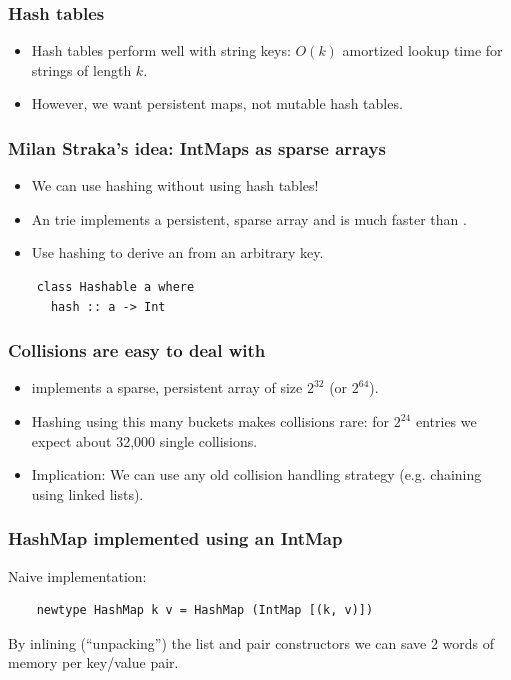 \documentclass[xetex,mathserif,serif]{beamer}
\newcommand{\code}[1]{\mbox{\texttt{\small{\color{CodeColor}{#1}}}}}
\begin{document}
\begin{frame}
  \frametitle{Hash tables}
  \begin{itemize}
  \item Hash tables perform well with string keys: $O(k)$ amortized
    lookup time for strings of length $k$.
  \item However, we want persistent maps, not mutable hash tables.
  \end{itemize}
\end{frame}

\begin{frame}[fragile]
  \frametitle{Milan Straka's idea: IntMaps as sparse arrays}
  \begin{itemize}
  \item We can use hashing without using hash tables!
  \item An \code{Data.IntMap} trie implements a persistent, sparse
    array and is much faster than \code{Data.Map}.
  \item Use hashing to derive an \code{Int} from an arbitrary
    key.
  \end{itemize}
  \begin{lstlisting}
    class Hashable a where
      hash :: a -> Int
  \end{lstlisting}
\end{frame}

\begin{frame}
  \frametitle{Collisions are easy to deal with}
  \begin{itemize}
  \item \code{IntMap} implements a sparse, persistent array of size
    $2^{32}$ (or $2^{64}$).
  \item Hashing using this many buckets makes collisions rare: for
    $2^{24}$ entries we expect about 32,000 single collisions.
  \item Implication: We can use any old collision handling strategy
    (e.g. chaining using linked lists).
  \end{itemize}
\end{frame}

\begin{frame}[fragile]
  \frametitle{HashMap implemented using an IntMap}

  Naive implementation:

  \begin{lstlisting}
    newtype HashMap k v = HashMap (IntMap [(k, v)])
  \end{lstlisting}

  By inlining (``unpacking'') the list and pair constructors we can
  save 2 words of memory per key/value pair.
\end{frame}
\end{document}
